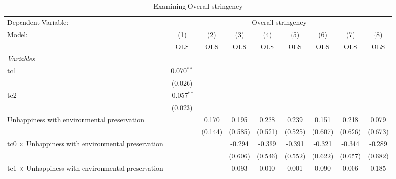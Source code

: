 
\begin{table}[htbp]
   \caption{Examining Overall stringency}
   \centering
   \begin{tabular}{lcccccccc}
      \toprule
      Dependent Variable: & \multicolumn{8}{c}{Overall stringency}\\
      Model:                                                    & (1)           & (2)     & (3)     & (4)          & (5)          & (6)          & (7)          & (8)\\  
                                                                &  OLS          & OLS     & OLS     & OLS          & OLS          & OLS          & OLS          & OLS\\  
      \midrule
      \emph{Variables}\\
      tc1                                                       & 0.070$^{**}$  &         &         &              &              &              &              &   \\   
                                                                & (0.026)       &         &         &              &              &              &              &   \\   
      tc2                                                       & -0.057$^{**}$ &         &         &              &              &              &              &   \\   
                                                                & (0.023)       &         &         &              &              &              &              &   \\   
      Unhappiness with environmental preservation               &               & 0.170   & 0.195   & 0.238        & 0.239        & 0.151        & 0.218        & 0.079\\   
                                                                &               & (0.144) & (0.585) & (0.521)      & (0.525)      & (0.607)      & (0.626)      & (0.673)\\   
      tc0 $\times$ Unhappiness with environmental preservation  &               &         & -0.294  & -0.389       & -0.391       & -0.321       & -0.344       & -0.289\\   
                                                                &               &         & (0.606) & (0.546)      & (0.552)      & (0.622)      & (0.657)      & (0.682)\\   
      tc1 $\times$ Unhappiness with environmental preservation  &               &         & 0.093   & 0.010        & 0.001        & 0.090        & 0.006        & 0.185\\   

\end{tabular}
\end{table}
